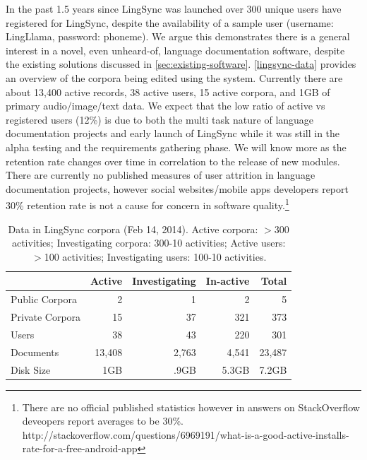 \documentclass[11pt]{article}
\newcommand{\smalltodo}[2][]
    {\todo[caption={#2}, #1]
    {\tiny#2\normalsize}}
\begin{document}
In the past 1.5 years since LingSync was launched over 300  unique
users  have registered for LingSync, despite the availability of a sample user (username: LingLlama, password: phoneme). We argue this demonstrates there is a general interest in a novel, even  unheard-of, language documentation software, despite the existing  solutions discussed in \autoref{sec:existing-software}.
\autoref{lingsync-data} provides an
overview of the corpora being edited using the system. Currently there are
about 13,400 active records, 38 active users, 15 active corpora, and 1GB of
primary audio/image/text data. We expect that the low ratio of active vs registered users (12\%) is due to both the multi task nature of language documentation projects and early launch of LingSync while it was still in the alpha testing and the requirements gathering phase. We will know more as the retention rate changes over time  in correlation to the release of new modules. There are currently no published measures of user attrition in language documentation projects, however  social websites/mobile apps  developers report 30\% retention rate is not a cause for concern in software quality.\footnote{There are no official published statistics however in answers on StackOverflow deveopers report averages to be 30\%. http://stackoverflow.com/questions/6969191/what-is-a-good-active-installs-rate-for-a-free-android-app} 


\begin{table}[h]
\begin{center}
\scriptsize
\begin{tabular}{lrrrr}
      \toprule
                     ~ &  Active & Investigating & In-active & Total\\
      \midrule
      Public Corpora  &       2 &   1 &   2 & 5 \\ 
      Private Corpora &      15 &  37 & 321 & 373\\ 
      Users           &      38 &  43 & 220 & 301 \\
      Documents & 13,408 & 2,763 & 4,541 &23,487\\
      Disk Size & 1GB & .9GB & 5.3GB& 7.2GB\\
      
      \bottomrule

\end{tabular}
\caption{Data in LingSync corpora (Feb 14, 2014).
Active corpora: $>$300 activities; Investigating corpora: 300-10 activities; Active users: $>$100 activities; Investigating users: 100-10 activities.}
\label{lingsync-data}
 \end{center}
 \normalsize
\end{table}
\end{document}
